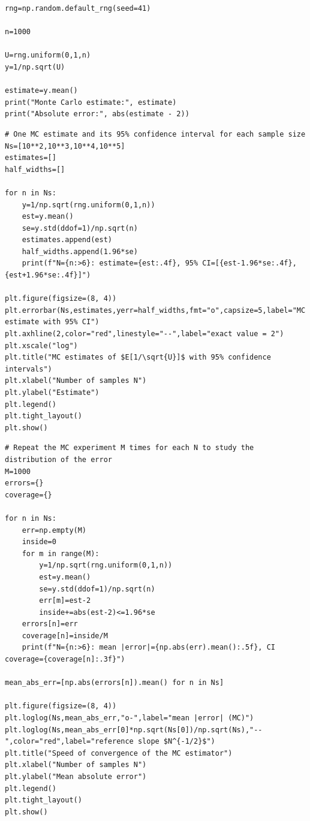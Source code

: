 \documentclass[11pt,a4paper]{article}
\begin{document}
\begin{lstlisting}[caption={Q2: basic Monte Carlo estimate of $\mathbb E[1/\sqrt U]$.}, label={lst:q2-basic}]
rng=np.random.default_rng(seed=41)

n=1000

U=rng.uniform(0,1,n)
y=1/np.sqrt(U)

estimate=y.mean()
print("Monte Carlo estimate:", estimate)
print("Absolute error:", abs(estimate - 2))
\end{lstlisting}

\begin{lstlisting}[caption={Q2: estimates and 95\% confidence intervals for $N=10^2,\dots,10^5$.}, label={lst:q2-ci}]
# One MC estimate and its 95% confidence interval for each sample size
Ns=[10**2,10**3,10**4,10**5]
estimates=[]
half_widths=[]

for n in Ns:
    y=1/np.sqrt(rng.uniform(0,1,n))
    est=y.mean()
    se=y.std(ddof=1)/np.sqrt(n)
    estimates.append(est)
    half_widths.append(1.96*se)
    print(f"N={n:>6}: estimate={est:.4f}, 95% CI=[{est-1.96*se:.4f}, {est+1.96*se:.4f}]")

plt.figure(figsize=(8, 4))
plt.errorbar(Ns,estimates,yerr=half_widths,fmt="o",capsize=5,label="MC estimate with 95% CI")
plt.axhline(2,color="red",linestyle="--",label="exact value = 2")
plt.xscale("log")
plt.title("MC estimates of $E[1/\sqrt{U}]$ with 95% confidence intervals")
plt.xlabel("Number of samples N")
plt.ylabel("Estimate")
plt.legend()
plt.tight_layout()
plt.show()
\end{lstlisting}

\begin{lstlisting}[caption={Q2: $M=1000$ repetitions per $N$, error distribution, CI coverage and convergence plot.}, label={lst:q2-repeat}]
# Repeat the MC experiment M times for each N to study the distribution of the error
M=1000
errors={}
coverage={}

for n in Ns:
    err=np.empty(M)
    inside=0
    for m in range(M):
        y=1/np.sqrt(rng.uniform(0,1,n))
        est=y.mean()
        se=y.std(ddof=1)/np.sqrt(n)
        err[m]=est-2
        inside+=abs(est-2)<=1.96*se
    errors[n]=err
    coverage[n]=inside/M
    print(f"N={n:>6}: mean |error|={np.abs(err).mean():.5f}, CI coverage={coverage[n]:.3f}")

mean_abs_err=[np.abs(errors[n]).mean() for n in Ns]

plt.figure(figsize=(8, 4))
plt.loglog(Ns,mean_abs_err,"o-",label="mean |error| (MC)")
plt.loglog(Ns,mean_abs_err[0]*np.sqrt(Ns[0])/np.sqrt(Ns),"--",color="red",label="reference slope $N^{-1/2}$")
plt.title("Speed of convergence of the MC estimator")
plt.xlabel("Number of samples N")
plt.ylabel("Mean absolute error")
plt.legend()
plt.tight_layout()
plt.show()
\end{lstlisting}
\end{document}
